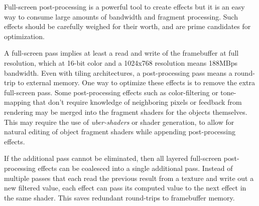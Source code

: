 Full-screen post-processing is a powerful tool to create effects but it is an
easy way to consume large amounts of bandwidth and fragment processing.  Such
effects should be carefully weighed for their worth, and are prime candidates
for optimization.  

A full-screen pass implies at least a read and write of the framebuffer at full
resolution, which at 16-bit color and a 1024x768 resolution means 188MBps
bandwidth.  Even with tiling architectures, a post-processing pass
means a round-trip to external memory.  One way to optimize these effects is to
remove the extra full-screen pass.  Some post-processing effects such as
color-filtering or tone-mapping that don't require knowledge of neighboring
pixels or feedback from rendering may be merged into the fragment shaders for
the objects themselves.  This may require the use of \textit{uber-shaders} or
shader generation, to allow for natural editing of object fragment shaders
while appending post-processing effects.

If the additional pass cannot be eliminated, then all layered full-screen
post-processing effects can be coalesced into a single additional pass.
Instead of multiple passes that each read the previous result from a texture
and write out a new filtered value, each effect can pass its computed value to
the next effect in the same shader.  This saves redundant round-trips to
framebuffer memory.

